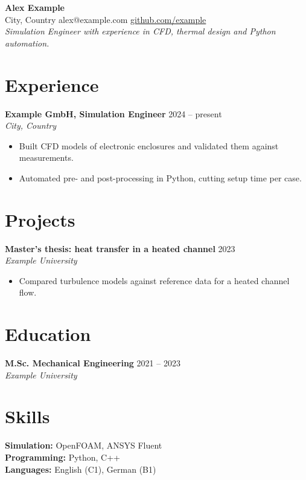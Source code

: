 \documentclass[10pt]{article}
\newcommand{\entry}[3]{\textbf{#1} \hfill #3\\ \textit{#2}\\}
\begin{document}
{\LARGE\bfseries Alex Example}\\[2pt]
City, Country \textbullet{} alex@example.com \textbullet{} \href{https://github.com/example}{github.com/example}\\[4pt]
\textit{Simulation Engineer with experience in CFD, thermal design and Python automation.}

\section{Experience}
\entry{Example GmbH, Simulation Engineer}{City, Country}{2024 -- present}
\begin{itemize}
  \item Built CFD models of electronic enclosures and validated them against measurements.
  \item Automated pre- and post-processing in Python, cutting setup time per case.
\end{itemize}

\section{Projects}
\entry{Master's thesis: heat transfer in a heated channel}{Example University}{2023}
\begin{itemize}
  \item Compared turbulence models against reference data for a heated channel flow.
\end{itemize}

\section{Education}
\entry{M.Sc. Mechanical Engineering}{Example University}{2021 -- 2023}

\section{Skills}
\textbf{Simulation:} OpenFOAM, ANSYS Fluent\\
\textbf{Programming:} Python, C++\\
\textbf{Languages:} English (C1), German (B1)
\end{document}
